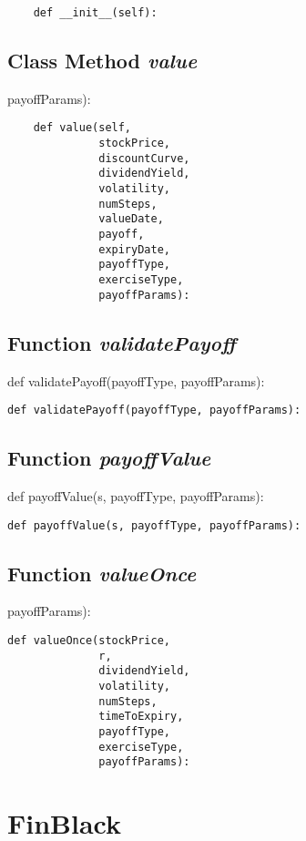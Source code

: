 \documentclass[twoside,11pt]{book}
\begin{document}
\begin{lstlisting}
    def __init__(self):
\end{lstlisting}

\subsection{Class Method {\it value}}
payoffParams):

\begin{lstlisting}
    def value(self,
              stockPrice,
              discountCurve,
              dividendYield,
              volatility,
              numSteps,
              valueDate,
              payoff,
              expiryDate,
              payoffType,
              exerciseType,
              payoffParams):
\end{lstlisting}

\subsection{Function {\it validatePayoff}}
def validatePayoff(payoffType, payoffParams):

\begin{lstlisting}
def validatePayoff(payoffType, payoffParams):
\end{lstlisting}

\subsection{Function {\it payoffValue}}
def payoffValue(s, payoffType, payoffParams):

\begin{lstlisting}
def payoffValue(s, payoffType, payoffParams):
\end{lstlisting}

\subsection{Function {\it valueOnce}}
payoffParams):

\begin{lstlisting}
def valueOnce(stockPrice,
              r,
              dividendYield,
              volatility,
              numSteps,
              timeToExpiry,
              payoffType,
              exerciseType,
              payoffParams):
\end{lstlisting}

\newpage
\section{FinBlack}
\end{document}
